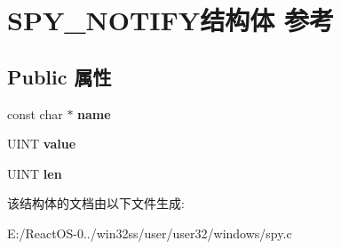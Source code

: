 \hypertarget{struct_s_p_y___n_o_t_i_f_y}{}\section{S\+P\+Y\+\_\+\+N\+O\+T\+I\+F\+Y结构体 参考}
\label{struct_s_p_y___n_o_t_i_f_y}
\subsection*{Public 属性}
\begin{DoxyCompactItemize}
\item 
\mbox{\label{struct_s_p_y___n_o_t_i_f_y_ad9ffe1ac3e1a22a206c3478ef00a23b1}} 
const char $\ast$ {\bfseries name}
\item 
\mbox{\label{struct_s_p_y___n_o_t_i_f_y_a1084521d94b722d85ff6f384f93d0524}} 
U\+I\+NT {\bfseries value}
\item 
\mbox{\label{struct_s_p_y___n_o_t_i_f_y_a11a6bbf7f5dd766a249229f8143d33bd}} 
U\+I\+NT {\bfseries len}
\end{DoxyCompactItemize}


该结构体的文档由以下文件生成\+:\begin{DoxyCompactItemize}
\item 
E\+:/\+React\+O\+S-\/0../win32ss/user/user32/windows/spy.\+c\end{DoxyCompactItemize}
